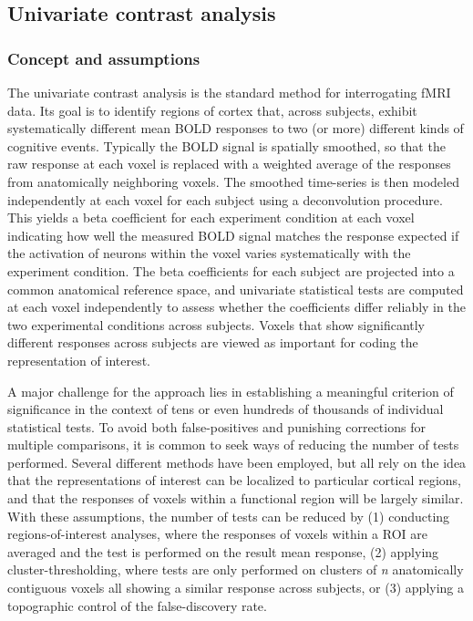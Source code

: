 \subsection{Univariate contrast analysis}
\subsubsection{Concept and assumptions} The univariate contrast analysis is the standard method for interrogating fMRI data. Its goal is to identify regions of cortex that, across subjects, exhibit systematically different mean BOLD responses to two (or more) different kinds of cognitive events. Typically the BOLD signal is spatially smoothed, so that the raw response at each voxel is replaced with a weighted average of the responses from anatomically neighboring voxels. The smoothed time-series is then modeled independently at each voxel for each subject using a deconvolution procedure. This yields a beta coefficient for each experiment condition at each voxel indicating how well the measured BOLD signal matches the response expected if the activation of neurons within the voxel varies systematically with the experiment condition. The beta coefficients for each subject are projected into a common anatomical reference space, and univariate statistical tests are computed at each voxel independently to assess whether the coefficients differ reliably in the two experimental conditions across subjects. Voxels that show significantly different responses across subjects are viewed as important for coding the representation of interest. 

A major challenge for the approach lies in establishing a meaningful criterion of significance in the context of tens or even hundreds of thousands of individual statistical tests. To avoid both false-positives and punishing corrections for multiple comparisons, it is common to seek ways of reducing the number of tests performed. Several different methods have been employed, but all rely on the idea that the representations of interest can be localized to particular cortical regions, and that the responses of voxels within a functional region will be largely similar. With these assumptions, the number of tests can be reduced by (1) conducting regions-of-interest analyses, where the responses of voxels within a ROI are averaged and the test is performed on the result mean response, (2) applying cluster-thresholding, where tests are only performed on clusters of {\em n} anatomically contiguous voxels all showing a similar response across subjects, or (3) applying a topographic control of the false-discovery rate. 
 
